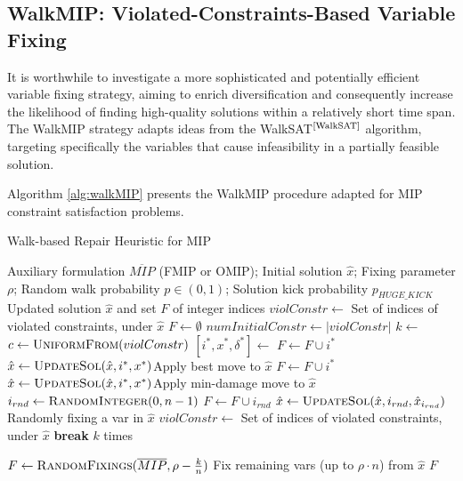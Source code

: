 \subsection{WalkMIP: Violated-Constraints-Based Variable Fixing}

It is worthwhile to investigate a more sophisticated and potentially efficient variable fixing strategy, aiming to enrich diversification and consequently increase the likelihood of finding high-quality solutions within a relatively short time span. The WalkMIP strategy adapts ideas from the WalkSAT$^\text{\cite{WalkSAT}}$ algorithm, targeting specifically the variables that cause infeasibility in a partially feasible solution. 

Algorithm \ref{alg:walkMIP} presents the WalkMIP procedure adapted for MIP constraint satisfaction problems.

\begin{algorithm}[htbp]
\caption{Walk-based Repair Heuristic for MIP}\label{alg:walkMIP}
\begin{algorithmic}[1]
\Require Auxiliary formulation $\overline{MIP}$ (FMIP or OMIP); Initial solution $\hat{x}$; Fixing parameter $\rho$; Random walk probability $p \in (0,1)$; Solution kick probability $p_{HUGE\_KICK}$
\Ensure Updated solution $\hat{x}$ and set $F$ of integer indices
    \State $violConstr \gets$ Set of indices of violated constraints, under $\hat{x}$
    \State $F \gets \emptyset$
     $numInitialConstr \gets |violConstr|$\EndIf
     \Return \EndIf
        \State \Return {}
    \EndIf
    \State $k \gets $
    \Repeat
        \State $c \gets \Call{UniformFrom}{violConstr}$
        \State $[i^*, x^*, \delta^*] \gets$ 
            \State $F \gets F \cup i^*$
            \State $\hat{x} \gets \Call{UpdateSol}{\hat{x},i^*,x^*}$\Comment Apply best move to $\hat{x}$
            \State $F \gets F \cup i^*$
            \State $\hat{x} \gets \Call{UpdateSol}{\hat{x},i^*,x^*}$\Comment Apply min-damage move to $\hat{x}$
        \Else 
            \State $i_{rnd} \gets \Call{RandomInteger}{0,n-1}$
            \State $F \gets F \cup i_{rnd}$
            \State $\hat{x} \gets \Call{UpdateSol}{\hat{x}, i_{rnd},\hat{x}_{i_{rnd}}}$ \Comment Randomly fixing a var in $\hat{x}$
        \EndIf
        \State $violConstr \gets$ Set of indices of violated constraints, under $\hat{x}$
         \textbf{break} \EndIf
    \Until $k$ times

        \State $F \gets  \Call{RandomFixings}{\overline{MIP},\rho- {k\over{n}}}$ \Comment Fix remaining vars (up to $\rho \cdot n$) from $\hat{x}$
    \EndIf
    \State \Return $F$
\EndFunction
\end{algorithmic}
\end{algorithm}

